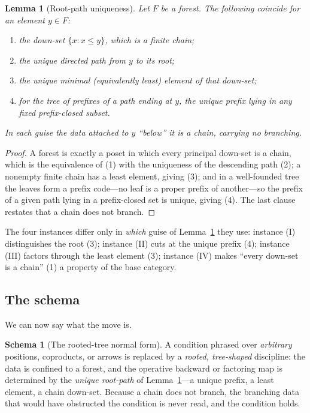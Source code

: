 \documentclass[11pt,reqno]{amsart}
\theoremstyle{plain}
\newtheorem{lemma}[theorem]{Lemma}
\theoremstyle{definition}
\newtheorem{schema}[theorem]{Schema}
\begin{document}
\begin{lemma}[Root-path uniqueness]\label{lem:rootpath}
Let $F$ be a forest. The following coincide for an element $y \in F$:
\begin{enumerate}
\item the down-set $\{x : x \le y\}$, which is a finite chain;
\item the unique directed path from $y$ to its root;
\item the unique \emph{minimal} (equivalently \emph{least}) element of that down-set;
\item for the tree of \emph{prefixes} of a path ending at $y$, the unique prefix lying in any fixed
prefix-closed subset.
\end{enumerate}
In each guise the data attached to $y$ ``below'' it is a chain, carrying no branching.
\end{lemma}

\begin{proof}
A forest is exactly a poset in which every principal down-set is a chain, which is the equivalence of
(1) with the uniqueness of the descending path (2); a nonempty finite chain has a least element, giving
(3); and in a well-founded tree the leaves form a prefix code---no leaf is a proper prefix of another---so
the prefix of a given path lying in a prefix-closed set is unique, giving (4). The last clause restates
that a chain does not branch.
\end{proof}

The four instances differ only in \emph{which} guise of Lemma~\ref{lem:rootpath} they use: instance (I)
distinguishes the root (3); instance (II) cuts at the unique prefix (4); instance (III) factors through
the least element (3); instance (IV) makes ``every down-set is a chain'' (1) a property of the base
category.

\subsection{The schema}
We can now say what the move is.

\begin{schema}[The rooted-tree normal form]\label{sch:main}
A condition phrased over \emph{arbitrary} positions, coproducts, or arrows is replaced by a
\emph{rooted, tree-shaped} discipline: the data is confined to a forest, and the operative backward or
factoring map is determined by the \emph{unique root-path} of Lemma~\ref{lem:rootpath}---a unique
prefix, a least element, a chain down-set. Because a chain does not branch, the branching data that
would have obstructed the condition is never read, and the condition holds.
\end{schema}
\end{document}
